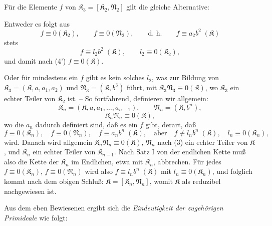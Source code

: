 \documentclass[11pt]{article}
\newcommand{\ideal}[1]{\mathfrak{#1}}
\begin{document}
Für die Elemente $f$ von $\ideal K_3=[\ideal K_2,\ideal N_2]$ gilt die gleiche Alternative:

Entweder es folgt aus
\[
 f\equiv0(\ideal K_2),\qquad f\equiv0(\ideal N_2),
 \qquad\text{d.~h.}\qquad f\equiv a_2b^2\;(\ideal K)
\]
stets
\[
 f\equiv l_2b^2\;(\ideal K),\qquad l_2\equiv0(\ideal K_2),
\]
und damit nach (4') $f\equiv0(\ideal K)$.

Oder für mindestens ein $f$ gibt es kein solches $l_2$, was zur Bildung von $\ideal K_3=(\ideal K,a,a_1,a_2)$ und $\ideal N_3=(\ideal K,b^3)$ führt, mit $\ideal K_3\ideal N_3\equiv0(\ideal K)$, wo $\ideal K_3$ ein echter Teiler von $\ideal K_2$ ist. -- So fortfahrend, definieren wir allgemein:
\[
 \ideal K_n=(\ideal K,a,a_1,\ldots,a_{n-1}),\qquad
 \ideal N_n=(\ideal K,b^n),
\]
\[
 \ideal K_n\ideal N_n\equiv0(\ideal K),
\]
wo die $a_n$ dadurch definiert sind, daß es ein $f$ gibt, derart, daß
\[
 f\equiv0(\ideal K_n),\quad f\equiv0(\ideal N_n),\quad
 f\equiv a_n b^n\;(\ideal K),\quad\text{aber}\quad
 f\not\equiv l_n b^n\;(\ideal K),\quad l_n\equiv0(\ideal K_n),
\]
wird. Danach wird allgemein $\ideal K_n\ideal N_n\equiv0(\ideal K)$, $\ideal N_n$ nach (3) ein echter Teiler von $\ideal K$, und $\ideal K_n$ ein echter Teiler von $\ideal K_{n-1}$. Nach Satz I von der endlichen Kette muß also die Kette der $\ideal K_n$ im Endlichen, etwa mit $\ideal K_n$, abbrechen. Für jedes $f\equiv0(\ideal K_n)$, $f\equiv0(\ideal N_n)$ wird also $f\equiv l_n b^n\;(\ideal K)$ mit $l_n\equiv0(\ideal K_n)$, und folglich kommt nach dem obigen Schluß: $\ideal K=[\ideal K_n,\ideal N_n]$, womit $\ideal K$ als reduzibel nachgewiesen ist.

Aus dem eben Bewiesenen ergibt sich die \emph{Eindeutigkeit der zugehörigen Primideale} wie folgt:
\end{document}
